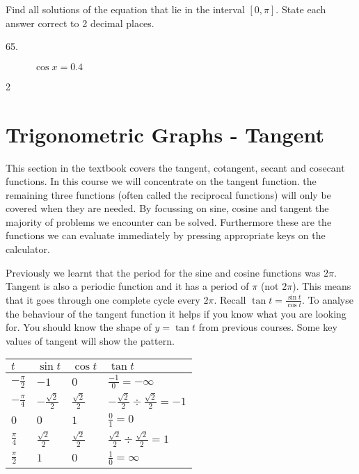 Find all solutions of the equation that lie in the interval $\left [0 ,\pi \right ]$. State each answer
correct to 2 decimal places. 


\begin{description}
	\item [65.] $\cos  x =0.4$ \end{description}


\columnsep =30pt
\begin {multicols}{2}



\end {multicols}


\section{Trigonometric Graphs - Tangent}

This section in the textbook covers the tangent, cotangent, secant and cosecant functions. In
this course we will concentrate on the tangent function. the remaining three functions (often called the reciprocal
functions) will only be covered when they are needed. By focussing on sine, cosine and tangent the majority
of problems we encounter can be solved. Furthermore these are the functions we can evaluate immediately by pressing
appropriate keys on the calculator. 

Previously we learnt that the period for the sine and cosine functions was $2 \pi $. Tangent is also a periodic function and it has a period of $\pi $ (not $2 \pi $). This means that it goes through one complete cycle every $2 \pi $. Recall $\tan  t =\frac{\sin  t}{\cos  t}$. To analyse the behaviour of the tangent function it helps if you know what you are looking
for. You should know the shape of $y =\tan  t$ from previous courses. Some key values of tangent will show the pattern. 


\begin{tabular}[c]{|l|l|l|l|}\hline
	$t$  & $\sin  t$  & $\cos  t$  & $\tan  t$  \\
	\hline
	$ -\frac{\pi }{2}$  & $ -1$  & $0$  & $\frac{ -1}{0} = -\infty $  \\
	\hline
	$ -\frac{\pi }{4}$  & $ -\frac{\sqrt{2}}{2}$  & $\frac{\sqrt{2}}{2}$  & $ -\frac{\sqrt{2}}{2} \div \frac{\sqrt{2}}{2} = -1$  \\
	\hline
	$0$  & $0$  & $1$  & $\frac{0}{1} =0$  \\
	\hline
	$\frac{\pi }{4}$  & $\frac{\sqrt{2}}{2}$  & $\frac{\sqrt{2}}{2}$  & $\frac{\sqrt{2}}{2} \div \frac{\sqrt{2}}{2} =1$  \\
	\hline
	$\frac{\pi }{2}$  & $1$  & $0$  & $\frac{1}{0} =\infty $  \\
	\hline
\end{tabular}

